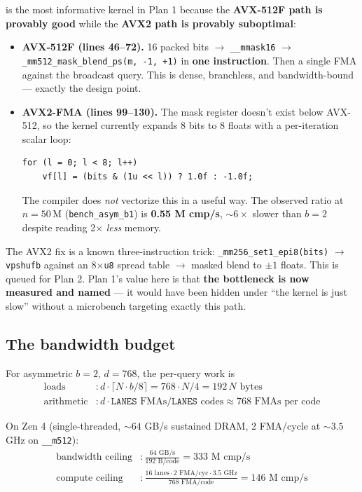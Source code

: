 \documentclass[11pt,a4paper]{article}
\begin{document}
 is the most informative kernel in
Plan 1 because the \textbf{AVX-512F path is provably good} while the
\textbf{AVX2 path is provably suboptimal}:

\begin{itemize}
    \item \textbf{AVX-512F (lines 46--72).} 16 packed bits $\to$
    \texttt{\_\_mmask16} $\to$ \texttt{\_mm512\_mask\_blend\_ps(m, -1,
    +1)} in \textbf{one instruction}. Then a single FMA against the
    broadcast query. This is dense, branchless, and bandwidth-bound
    --- exactly the design point.

    \item \textbf{AVX2-FMA (lines 99--130).} The mask register doesn't
    exist below AVX-512, so the kernel currently expands 8 bits to 8
    floats with a per-iteration scalar loop:
\begin{lstlisting}[style=cstyle]
for (l = 0; l < 8; l++)
    vf[l] = (bits & (1u << l)) ? 1.0f : -1.0f;
\end{lstlisting}
    The compiler does \emph{not} vectorize this in a useful way. The
    observed ratio at $n = 50\,\mathrm{M}$ (\texttt{bench\_asym\_b1})
    is \textbf{0.55 M cmp/s}, $\sim 6\times$ slower than $b = 2$
    despite reading 2$\times$ \emph{less} memory.
\end{itemize}

The AVX2 fix is a known three-instruction trick:
\texttt{\_mm256\_set1\_epi8(bits)} $\to$ \texttt{vpshufb} against an
8$\times$\texttt{u8} spread table $\to$ masked blend to $\pm 1$
floats. This is queued for Plan 2. Plan 1's value here is that
\textbf{the bottleneck is now measured and named} --- it would have
been hidden under ``the kernel is just slow'' without a microbench
targeting exactly this path.

\subsection{The bandwidth budget}

For asymmetric $b = 2$, $d = 768$, the per-query work is
\begin{align}
\text{loads}      &: d \cdot \lceil N \cdot b / 8 \rceil = 768 \cdot N/4 = 192\,N \text{ bytes} \\
\text{arithmetic} &: d \cdot \texttt{LANES} \text{ FMAs} / \texttt{LANES} \text{ codes} \approx 768 \text{ FMAs per code}
\end{align}

On Zen 4 (single-threaded, $\sim 64$ GB/s sustained DRAM, 2 FMA/cycle
at $\sim 3.5$ GHz on \texttt{\_\_m512}):
\begin{align}
\text{bandwidth ceiling} &: \frac{64 \text{ GB/s}}{192 \text{ B/code}} = 333 \text{ M cmp/s} \\
\text{compute ceiling}   &: \frac{16 \text{ lanes} \cdot 2 \text{ FMA/cyc} \cdot 3.5 \text{ GHz}}{768 \text{ FMA/code}} = 146 \text{ M cmp/s}
\end{align}
\end{document}
